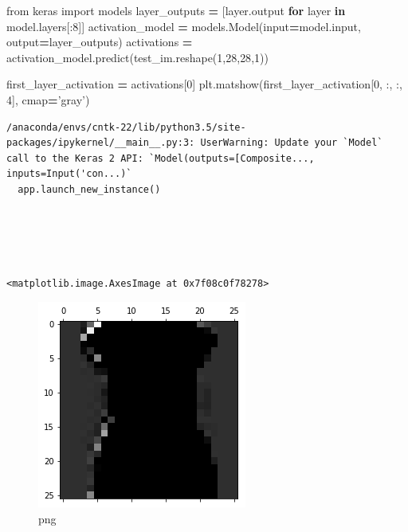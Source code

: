 \documentclass[]{book}
\newenvironment{Shaded}{\begin{snugshade}}{\end{snugshade}}
\newcommand{\KeywordTok}[1]{\textcolor[rgb]{0.13,0.29,0.53}{\textbf{#1}}}
\newcommand{\DecValTok}[1]{\textcolor[rgb]{0.00,0.00,0.81}{#1}}
\newcommand{\StringTok}[1]{\textcolor[rgb]{0.31,0.60,0.02}{#1}}
\newcommand{\ImportTok}[1]{#1}
\newcommand{\ControlFlowTok}[1]{\textcolor[rgb]{0.13,0.29,0.53}{\textbf{#1}}}
\newcommand{\OperatorTok}[1]{\textcolor[rgb]{0.81,0.36,0.00}{\textbf{#1}}}
\newcommand{\BuiltInTok}[1]{#1}
\newcommand{\NormalTok}[1]{#1}
\theoremstyle{definition}
\theoremstyle{definition}
\theoremstyle{definition}
\theoremstyle{remark}
\begin{document}
\begin{Shaded}
\begin{Highlighting}[]
\ImportTok{from}\NormalTok{ keras }\ImportTok{import}\NormalTok{ models}
\NormalTok{layer_outputs }\OperatorTok{=}\NormalTok{ [layer.output }\ControlFlowTok{for}\NormalTok{ layer }\KeywordTok{in}\NormalTok{ model.layers[:}\DecValTok{8}\NormalTok{]]}
\NormalTok{activation_model }\OperatorTok{=}\NormalTok{ models.Model(}\BuiltInTok{input}\OperatorTok{=}\NormalTok{model.}\BuiltInTok{input}\NormalTok{, output}\OperatorTok{=}\NormalTok{layer_outputs)}
\NormalTok{activations }\OperatorTok{=}\NormalTok{ activation_model.predict(test_im.reshape(}\DecValTok{1}\NormalTok{,}\DecValTok{28}\NormalTok{,}\DecValTok{28}\NormalTok{,}\DecValTok{1}\NormalTok{))}

\NormalTok{first_layer_activation }\OperatorTok{=}\NormalTok{ activations[}\DecValTok{0}\NormalTok{]}
\NormalTok{plt.matshow(first_layer_activation[}\DecValTok{0}\NormalTok{, :, :, }\DecValTok{4}\NormalTok{], cmap}\OperatorTok{=}\StringTok{'gray'}\NormalTok{)}
\end{Highlighting}
\end{Shaded}

\begin{verbatim}
/anaconda/envs/cntk-22/lib/python3.5/site-packages/ipykernel/__main__.py:3: UserWarning: Update your `Model` call to the Keras 2 API: `Model(outputs=[Composite..., inputs=Input('con...)`
  app.launch_new_instance()





<matplotlib.image.AxesImage at 0x7f08c0f78278>
\end{verbatim}

\begin{figure}
\centering
\includegraphics{output_12_2.png}
\caption{png}
\end{figure}
\end{document}
